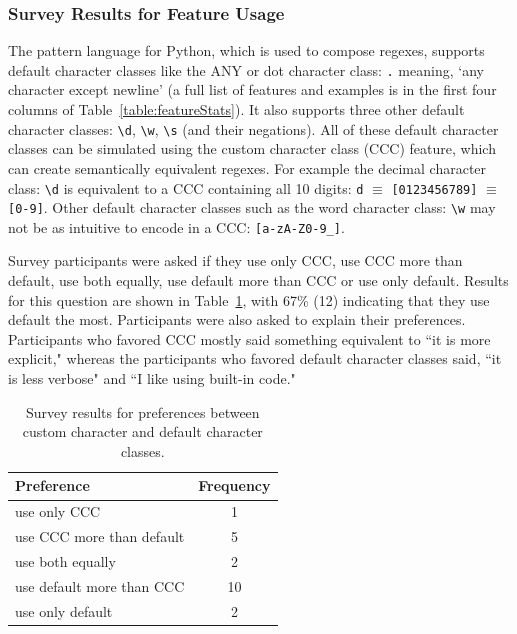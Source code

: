 \subsubsection{Survey Results for Feature Usage}
The pattern language for Python, which is used to compose regexes, supports default character classes like the ANY or dot character class: \verb!.! meaning, `any character except newline' (a full list of features and examples is in the first four columns of Table~\ref{table:featureStats}).  
It also supports three other default character classes: \verb!\d!, \verb!\w!, \verb!\s! (and their negations). All of these default character classes can be simulated using the custom character class (CCC) feature, which can create semantically equivalent regexes.  
For example  the decimal character class: \verb!\d! is equivalent to a CCC containing all 10 digits:  \verb!d! $\equiv$ \verb![0123456789]! $\equiv$ \verb![0-9]!.  
Other default character classes such as the word character class: \verb!\w! may not be as intuitive to encode in a CCC: \verb![a-zA-Z0-9_]!.  

Survey participants were asked if they use only CCC, use CCC more than default, use both equally, use default more than CCC or use only default.  Results for this question are shown in Table~\ref{tab:cccvsdefault}, with 67\% (12) indicating that they use default the most. 
Participants were also asked to explain their preferences.  Participants who favored CCC mostly said something equivalent to ``it is more explicit," whereas the participants who favored default character classes said,  ``it is less verbose" and ``I like using built-in code."

\begin{table}
\caption{Survey results for preferences between custom character and default character classes. \label{tab:cccvsdefault}}
\begin{center}
\begin{tabular}{l|c}
Preference & Frequency \\ \hline
use only CCC & 1\\
use CCC more than default & 5 \\
use both equally & 2\\
use default more than CCC & 10\\
use only default & 2\\

\end{tabular}
\end{center}
\end{table}

